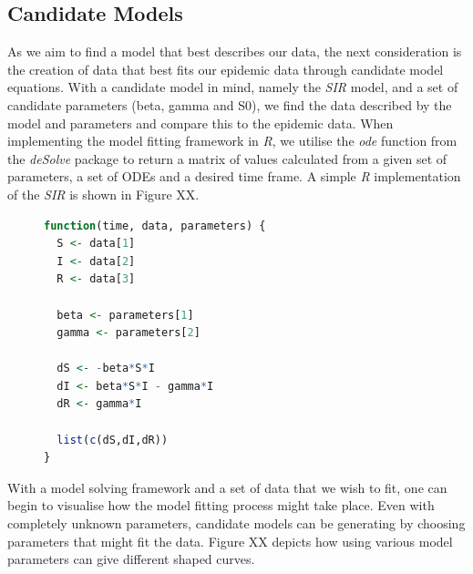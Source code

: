 \documentclass[11pt, a4paper, oneside,titlepage]{article}
\begin{document}
\subsection{Candidate Models}
As we aim to find a model that best describes our data, the next
consideration is the creation of data that best fits our epidemic data
through candidate model equations. With a candidate model in mind,
namely the \emph{SIR} model, and a set of candidate parameters (beta,
gamma and S0), we find the data described by the model and parameters
and compare this to the epidemic data. When implementing the model fitting
framework in \emph{R}, we utilise the \emph{ode} function from the
\emph{deSolve} package to return a matrix of values calculated from a
given set of parameters, a set of ODEs and a desired time frame. A
simple \emph{R} implementation of the \emph{SIR} is shown in Figure
XX.

\begin{center}
\begin{figure}[ht!]

\begin{lstlisting}[language=R, style=customc]
function(time, data, parameters) {
  S <- data[1]
  I <- data[2]
  R <- data[3]

  beta <- parameters[1]
  gamma <- parameters[2]

  dS <- -beta*S*I
  dI <- beta*S*I - gamma*I
  dR <- gamma*I

  list(c(dS,dI,dR))
}
\end{lstlisting}
\end{figure}
\end{center}

With a model solving framework and a set of data that we wish to fit,
one can begin to visualise how the model fitting process might take
place. Even with completely unknown parameters, candidate models can
be generating by choosing parameters that might fit the data. Figure
XX depicts how using various model parameters can give different
shaped curves. 
\end{document}
